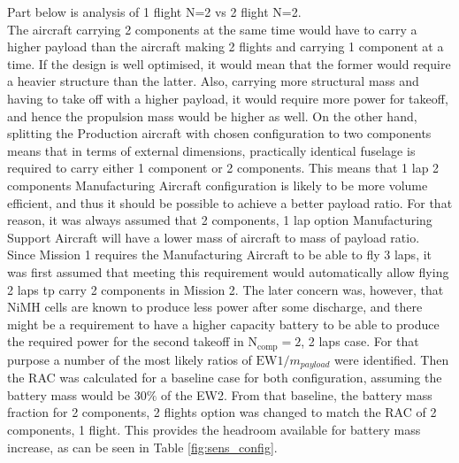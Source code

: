 Part below is analysis of 1 flight N=2 vs 2 flight N=2.\\

The aircraft carrying 2 components at the same time would have to carry a higher payload than the aircraft making 2 flights and carrying 1 component at a time. If the design is well optimised, it would mean that the former would require a heavier structure than the latter. Also, carrying more structural mass and having to take off with a higher payload, it would require more power for takeoff, and hence the propulsion mass would be higher as well. On the other hand, splitting the Production aircraft with chosen configuration to two components means that in terms of external dimensions, practically identical fuselage is required to carry either 1 component or 2 components. This means that 1 lap 2 components Manufacturing Aircraft configuration is likely to be more volume efficient, and thus it should be possible to achieve a better payload ratio. For that reason, it was always assumed that 2 components, 1 lap option Manufacturing Support Aircraft will have a lower mass of aircraft to mass of payload ratio.\\

Since Mission 1 requires the Manufacturing Aircraft to be able to fly 3 laps, it was first assumed that meeting this requirement would automatically allow flying 2 laps tp carry 2 components in Mission 2. The later concern was, however, that NiMH cells are known to produce less power after some discharge, and there might be a requirement to have a higher capacity battery to be able to produce the required power for the second takeoff in $\text{N}_{\text{comp}} = 2$, 2 laps case. For that purpose a number of the most likely ratios of $\text{EW1} / m_{payload}$ were identified. Then the RAC was calculated for a baseline case for both configuration, assuming the battery mass would be $30\%$ of the EW2. From that baseline, the battery mass fraction for 2 components, 2 flights option was changed to match the RAC of 2 components, 1 flight. This provides the headroom available for battery mass increase, as can be seen in Table \ref{fig:sens_config}.

